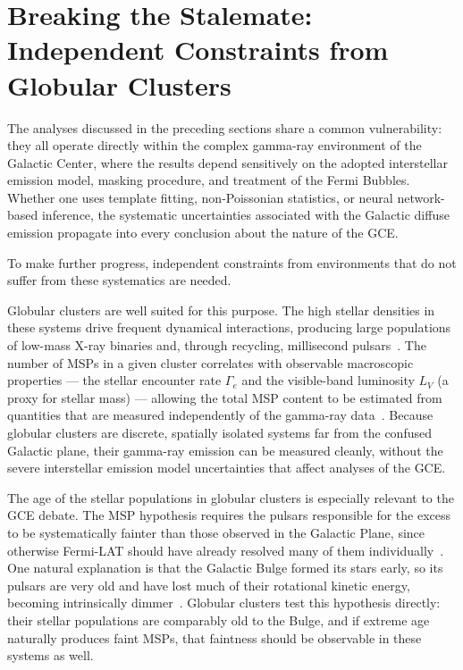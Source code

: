 
\section{Breaking the Stalemate: Independent Constraints from Globular Clusters}
\label{sec:4.5}

The analyses discussed in the preceding sections share a common vulnerability: they all operate directly within the complex gamma-ray environment of the Galactic Center, where the results depend sensitively on the adopted interstellar emission model, masking procedure, and treatment of the Fermi Bubbles.
Whether one uses template fitting, non-Poissonian statistics, or neural network-based inference, the systematic uncertainties associated with the Galactic diffuse emission propagate into every conclusion about the nature of the GCE.

To make further progress, independent constraints from environments that do not suffer from these systematics are needed.

Globular clusters are well suited for this purpose.
The high stellar densities in these systems drive frequent dynamical interactions, producing large populations of low-mass X-ray binaries and, through recycling, millisecond pulsars~\cite{Amerio:2024qor}.
The number of MSPs in a given cluster correlates with observable macroscopic properties --- the stellar encounter rate $\Gamma_e$ and the visible-band luminosity $L_V$ (a proxy for stellar mass) --- allowing the total MSP content to be estimated from quantities that are measured independently of the gamma-ray data~\cite{Amerio:2024qor}.
Because globular clusters are discrete, spatially isolated systems far from the confused Galactic plane, their gamma-ray emission can be measured cleanly, without the severe interstellar emission model uncertainties that affect analyses of the GCE.

The age of the stellar populations in globular clusters is especially relevant to the GCE debate.
The MSP hypothesis requires the pulsars responsible for the excess to be systematically fainter than those observed in the Galactic Plane, since otherwise Fermi-LAT should have already resolved many of them individually~\cite{Hooper:2016rap, Holst:2024fvb}.
One natural explanation is that the Galactic Bulge formed its stars early, so its pulsars are very old and have lost much of their rotational kinetic energy, becoming intrinsically dimmer~\cite{Amerio:2024qor}.
Globular clusters test this hypothesis directly: their stellar populations are comparably old to the Bulge, and if extreme age naturally produces faint MSPs, that faintness should be observable in these systems as well.

